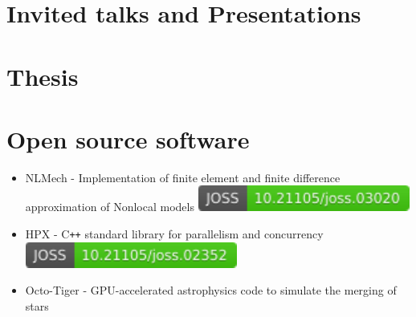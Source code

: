 \documentclass[11pt,a4paper,sans]{moderncv}
\begin{document}




 

\section{Invited talks and Presentations}

\section{Thesis}
\section{Open source software}
\cvitem{}{}
\begin{itemize}[leftmargin=4cm]
\item NLMech - Implementation of finite element and finite difference approximation of Nonlocal models \href{https://doi.org/10.21105/joss.03020}{\includegraphics[scale=0.5]{status-nlmech-small.pdf}}
\item HPX - C\texttt{++} standard library for parallelism and concurrency \href{https://doi.org/10.21105/joss.02352}{\includegraphics[scale=0.5]{status-hpx.pdf}}
\item Octo-Tiger - GPU-accelerated astrophysics code to simulate the merging of stars
\end{itemize}
\end{document}
